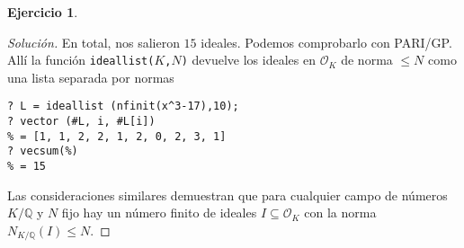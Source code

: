 \documentclass{article}
\newcounter{tarea}
\theoremstyle{definition}
\newtheorem{ejercicio}{Ejercicio}[tarea]
\newenvironment{solucion}{\begin{proof}[Solución]}{\end{proof}}
\newcommand{\QQ}{\mathbb{Q}}
\renewcommand{\O}{\mathcal{O}}
\begin{document}
\begin{ejercicio}
\begin{solucion}
    En total, nos salieron $15$ ideales. Podemos comprobarlo con PARI/GP.
    Allí la función \texttt{ideallist($K$,$N$)} devuelve los ideales en $\O_K$
    de norma $\le N$ como una lista separada por normas
    \begin{framed}\small
\begin{verbatim}
? L = ideallist (nfinit(x^3-17),10);
? vector (#L, i, #L[i])
% = [1, 1, 2, 2, 1, 2, 0, 2, 3, 1]
? vecsum(%)
% = 15
\end{verbatim}
    \end{framed}

    Las consideraciones similares demuestran que para cualquier campo de números
    $K/\QQ$ y $N$ fijo hay un número finito de ideales
    $I \subseteq \O_K$ con la norma $N_{K/\QQ} (I) \le N$.
  \end{solucion}
  \fi
\end{ejercicio}
\end{document}

